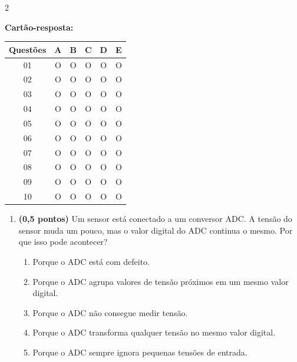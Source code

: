 \documentclass[a4paper,12pt]{article}
\begin{document}
\begin{multicols}{2}
\raggedcolumns

\textbf{Cartão-resposta:}

\vspace{0.2cm}

\begin{tabular}{|c|c|c|c|c|c|}
\hline
\textbf{Questões} & A & B & C & D & E \\
\hline
01 & O & O & O & O & O \\
\hline
02 & O & O & O & O & O \\
\hline
03 & O & O & O & O & O \\
\hline
04 & O & O & O & O & O \\
\hline
05 & O & O & O & O & O \\
\hline
06 & O & O & O & O & O \\
\hline
07 & O & O & O & O & O \\
\hline
08 & O & O & O & O & O \\
\hline
09 & O & O & O & O & O \\
\hline
10 & O & O & O & O & O \\
\hline
\end{tabular}

\vspace{0.7cm}

\begin{enumerate}[leftmargin=*]


\item \textbf{(0,5 pontos)} Um sensor está conectado a um conversor ADC.
A tensão do sensor muda um pouco, mas o valor digital do ADC continua o mesmo.
Por que isso pode acontecer?

\begin{enumerate}[label=(\Alph*)]
    \item Porque o ADC está com defeito.
    \item Porque o ADC agrupa valores de tensão próximos em um mesmo valor digital.
    \item Porque o ADC não consegue medir tensão.
    \item Porque o ADC transforma qualquer tensão no mesmo valor digital.
    \item Porque o ADC sempre ignora pequenas tensões de entrada.
\end{enumerate}


\end{enumerate}
\end{multicols}
\end{document}
